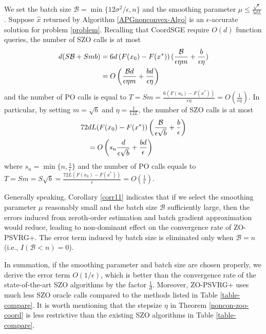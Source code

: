  \begin{corollary}\label{corr11}
We set the batch size $\mathcal{B} = \min\{12\sigma^2/\epsilon, n\}$ and the smoothing parameter $\mu \leq \frac{\sqrt{\epsilon}}{5{dL}}$. Suppose $\hat{x}$ returned by Algorithm \ref{APGnonconvex-Algo}  is an $\epsilon$-accurate solution for problem \eqref{problem}. Recalling that CoordSGE require $O(d)$ function queries, the number of SZO calls is at most 
\begin{align}
d(S\mathcal{B}+Smb) &= 6d \left(F(x_0) - F({x}^*)\right) (\frac{\mathcal{B}}{\epsilon\eta m}+\frac{b}{\epsilon\eta})\notag\\
& = O\left(\frac{\mathcal{B}d}{\epsilon\eta m}+\frac{bd}{\epsilon\eta}\right)\label{SZO-call-nocon}
\end{align}
and the number of PO calls is equal to $T = Sm = \frac{6\left(F(x_0) - F({x}^*)\right)}{\epsilon\eta} = O\left(\frac{1}{\epsilon\eta}\right)$. In particular, by setting $m=\sqrt{b}$ and $\eta = \frac{1}{12L}$, the number of SZO calls is at most 
\begin{align}
72&d L (F(x_0)-F(x^*))\left(\frac{\mathcal{B}}{\epsilon\sqrt{b}}+\frac{b}{\epsilon}\right)\notag\\
& = O\left(s_n\frac{d}{\epsilon \sqrt{b}}+\frac{bd}{\epsilon}\right)\label{SZO-call-par-nocon}
\end{align}
where $s_n = \min\{n,\frac{1}{\epsilon}\}$ and the number of PO calls equals to $T = Sm = S\sqrt{b} = \frac{72 L \left(F(x_0) - F({x}^*)\right)}{\epsilon} = O\left(\frac{1}{\epsilon}\right)$. 
\end{corollary}
Generally speaking, Corollary \ref{corr11} indicates  that if we select the smoothing parameter $\mu$ reasonably small and the batch size $\mathcal{B}$ sufficiently large, then the errors induced from zeroth-order estimation and batch gradient approximation would reduce, leading to non-dominant effect on the convergence rate of ZO-PSVRG+.
The error term induced by batch size  is eliminated only when $\mathcal{B} = n$  (i.e., $I(\mathcal{B} < n) = 0$). 
\iffalse
In
this case, ZO-PSVRG+ changes to ZO-ProxSVRG since Step 5 of Algorithm \ref{APGnonconvex-Algo} becomes $\hat{g}^s = \hat{\nabla} f(\tilde{x}^{s-1})$. Note that equation \eqref{SZO-call-par-nocon} shows that a large batch $\mathcal{B}$  for $\mathcal{B} \neq n$ indeed reduces the error inherited by the variance of batch gradient and improves the convergence of ZO-PSVRG+.  
\fi
In summation, if the smoothing parameter and batch size are chosen properly, we derive the error term $O(1/\epsilon)$, which is better than the convergence rate of the state-of-the-art SZO algorithms by the factor $\frac{1}{d}$. Moreover, ZO-PSVRG+ uses much less SZO oracle calls compared to the methods listed in Table \ref{table-compare}. 
It is worth mentioning that the stepsize $\eta$ in Theorem \ref{noncon-zoo-coord} is less restrictive than the existing SZO algorithms in Table \ref{table-compare}. 

